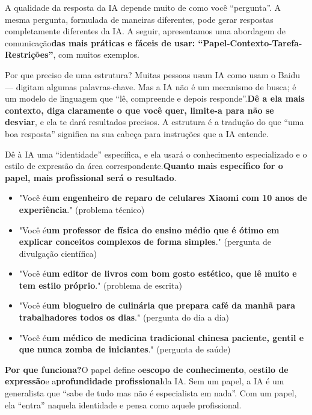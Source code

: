 
A qualidade da resposta da IA depende muito de como você “pergunta”. A mesma pergunta, formulada de maneiras diferentes, pode gerar respostas completamente diferentes da IA. A seguir, apresentamos uma abordagem de comunicação\textbf{das mais práticas e fáceis de usar: “Papel-Contexto-Tarefa-Restrições”}, com muitos exemplos.

\begin{tcbinfo}{Por que preciso de uma estrutura?}
Muitas pessoas usam IA como usam o Baidu — digitam algumas palavras-chave. Mas a IA não é um mecanismo de busca; é um modelo de linguagem que “lê, compreende e depois responde”.\textbf{Dê a ela mais contexto, diga claramente o que você quer, limite-a para não se desviar}, e ela te dará resultados precisos. A estrutura é a tradução do que “uma boa resposta” significa na sua cabeça para instruções que a IA entende.

\end{tcbinfo}


Dê à IA uma “identidade” específica, e ela usará o conhecimento especializado e o estilo de expressão da área correspondente.\textbf{Quanto mais específico for o papel, mais profissional será o resultado}.


\begin{itemize}
  \item "Você é\textbf{um engenheiro de reparo de celulares Xiaomi com 10 anos de experiência}." (problema técnico)
  \item "Você é\textbf{um professor de física do ensino médio que é ótimo em explicar conceitos complexos de forma simples}." (pergunta de divulgação científica)
  \item "Você é\textbf{um editor de livros com bom gosto estético, que lê muito e tem estilo próprio}." (problema de escrita)
  \item "Você é\textbf{um blogueiro de culinária que prepara café da manhã para trabalhadores todos os dias}." (pergunta do dia a dia)
  \item "Você é\textbf{um médico de medicina tradicional chinesa paciente, gentil e que nunca zomba de iniciantes}." (pergunta de saúde)
\end{itemize}

\textbf{Por que funciona?}O papel define o\textbf{escopo de conhecimento}, o\textbf{estilo de expressão}e a\textbf{profundidade profissional}da IA. Sem um papel, a IA é um generalista que “sabe de tudo mas não é especialista em nada”. Com um papel, ela “entra” naquela identidade e pensa como aquele profissional.

